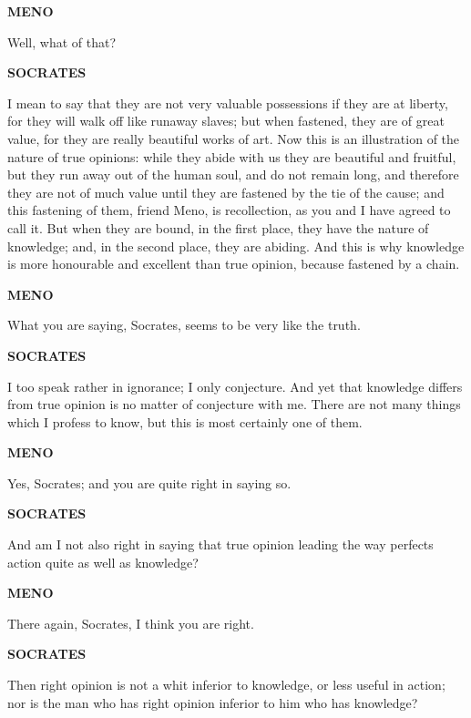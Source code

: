 \documentclass[11pt,letter]{article}
\begin{document}
\par \textbf{MENO}
\par   Well, what of that?

\par \textbf{SOCRATES}
\par   I mean to say that they are not very valuable possessions if they are at liberty, for they will walk off like runaway slaves; but when fastened, they are of great value, for they are really beautiful works of art. Now this is an illustration of the nature of true opinions:  while they abide with us they are beautiful and fruitful, but they run away out of the human soul, and do not remain long, and therefore they are not of much value until they are fastened by the tie of the cause; and this fastening of them, friend Meno, is recollection, as you and I have agreed to call it. But when they are bound, in the first place, they have the nature of knowledge; and, in the second place, they are abiding. And this is why knowledge is more honourable and excellent than true opinion, because fastened by a chain.

\par \textbf{MENO}
\par   What you are saying, Socrates, seems to be very like the truth.

\par \textbf{SOCRATES}
\par   I too speak rather in ignorance; I only conjecture. And yet that knowledge differs from true opinion is no matter of conjecture with me. There are not many things which I profess to know, but this is most certainly one of them.

\par \textbf{MENO}
\par   Yes, Socrates; and you are quite right in saying so.

\par \textbf{SOCRATES}
\par   And am I not also right in saying that true opinion leading the way perfects action quite as well as knowledge?

\par \textbf{MENO}
\par   There again, Socrates, I think you are right.

\par \textbf{SOCRATES}
\par   Then right opinion is not a whit inferior to knowledge, or less useful in action; nor is the man who has right opinion inferior to him who has knowledge?
\end{document}
